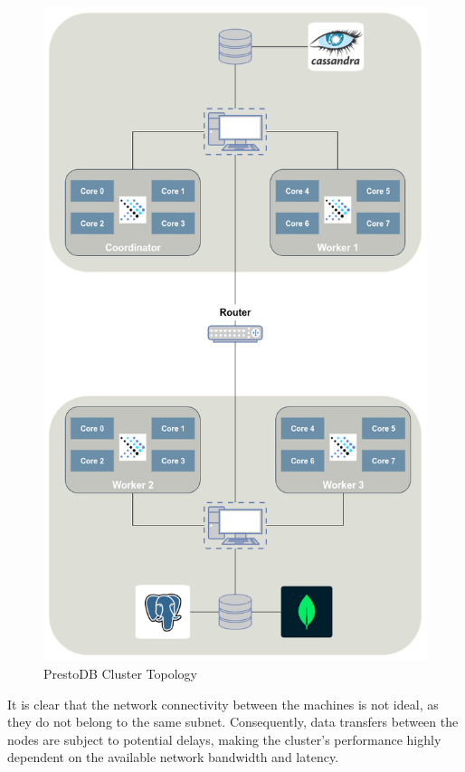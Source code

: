 \documentclass[conference]{IEEEtran}
\begin{document}
\begin{figure}[htbp]
    \centering
    \includegraphics[width=\linewidth]{figures/cluster_topology.png}
    \caption{PrestoDB Cluster Topology }
    \label{fig:cluster_topology}
\end{figure}

It is clear that the network connectivity between the machines is not ideal, as they do not belong to the same subnet. Consequently, data transfers between the nodes are subject to potential delays, making the cluster's performance highly dependent on the available network bandwidth and latency.
\end{document}
